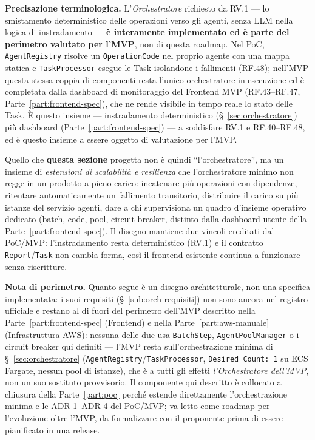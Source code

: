 \documentclass[11pt,a4paper]{article}
\begin{document}
\textbf{Precisazione terminologica.} L'\emph{Orchestratore} richiesto da RV.1 --- lo smistamento deterministico delle operazioni verso gli agenti, senza LLM nella logica di instradamento --- \textbf{è interamente implementato ed è parte del perimetro valutato per l'MVP}, non di questa roadmap. Nel PoC, \texttt{AgentRegistry} risolve un \texttt{OperationCode} nel proprio agente con una mappa statica e \texttt{TaskProcessor} esegue le Task isolandone i fallimenti (RF.48); nell'MVP questa stessa coppia di componenti resta l'unico orchestratore in esecuzione ed è completata dalla dashboard di monitoraggio del Frontend MVP (RF.43--RF.47, Parte~\ref{part:frontend-spec}), che ne rende visibile in tempo reale lo stato delle Task. È questo insieme --- instradamento deterministico (\S~\ref{sec:orchestratore}) più dashboard (Parte~\ref{part:frontend-spec}) --- a soddisfare RV.1 e RF.40--RF.48, ed è questo insieme a essere oggetto di valutazione per l'MVP.

Quello che \textbf{questa sezione} progetta non è quindi ``l'orchestratore'', ma un insieme di \emph{estensioni di scalabilità e resilienza} che l'orchestratore minimo non regge in un prodotto a pieno carico: incatenare più operazioni con dipendenze, ritentare automaticamente un fallimento transitorio, distribuire il carico su più istanze del servizio agenti, dare a chi supervisiona un quadro d'insieme operativo dedicato (batch, code, pool, circuit breaker, distinto dalla dashboard utente della Parte~\ref{part:frontend-spec}). Il disegno mantiene due vincoli ereditati dal PoC/MVP: l'instradamento resta deterministico (RV.1) e il contratto \texttt{Report}/\texttt{Task} non cambia forma, così il frontend esistente continua a funzionare senza riscritture.

\textbf{Nota di perimetro.} Quanto segue è un disegno architetturale, non una specifica implementata: i suoi requisiti (\S~\ref{sub:orch-requisiti}) non sono ancora nel registro ufficiale e restano al di fuori del perimetro dell'MVP descritto nella Parte~\ref{part:frontend-spec} (Frontend) e nella Parte~\ref{part:aws-manuale} (Infrastruttura AWS): nessuna delle due usa \texttt{BatchStep}, \texttt{AgentPoolManager} o i circuit breaker qui definiti --- l'MVP resta sull'orchestrazione minima di \S~\ref{sec:orchestratore} (\texttt{AgentRegistry}/\texttt{TaskProcessor}, \texttt{Desired Count: 1} su ECS Fargate, nessun pool di istanze), che è a tutti gli effetti \emph{l'Orchestratore dell'MVP}, non un suo sostituto provvisorio. Il componente qui descritto è collocato a chiusura della Parte~\ref{part:poc} perché estende direttamente l'orchestrazione minima e le ADR-1--ADR-4 del PoC/MVP; va letto come roadmap per l'evoluzione oltre l'MVP, da formalizzare con il proponente prima di essere pianificato in una release.
\end{document}
